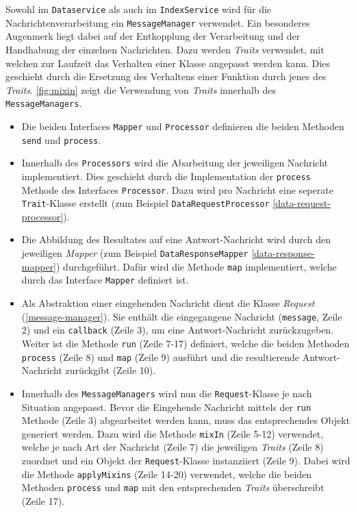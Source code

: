 
Sowohl im \texttt{Dataservice} als auch im \texttt{IndexService} wird für die Nachrichtenverarbeitung ein \texttt{Mess\-age\-Man\-ager} verwendet. Ein besonderes Augenmerk liegt dabei auf der Entkopplung der Verarbeitung und der Handhabung der einzelnen Nachrichten. Dazu werden \textit{Traits} verwendet, mit welchen zur Laufzeit das Verhalten einer Klasse angepasst werden kann. Dies geschieht durch die Ersetzung des Verhaltens einer Funktion durch jenes des \textit{Traits}. \autoref{fig:mixin} zeigt die Verwendung von \textit{Traits} innerhalb des \texttt{Mes\-sage\-Man\-agers}.

\begin{itemize}
    \item Die beiden Interfaces \texttt{Mapper} und \texttt{Processor} definieren die beiden Methoden \texttt{send} und \texttt{process}.\\
    \item Innerhalb des \texttt{Processors} wird die Abarbeitung der jeweiligen Nachricht implementiert. Dies geschieht durch die Implementation der \texttt{process} Methode des Interfaces \texttt{Processor}. Dazu wird pro Nachricht eine seperate \texttt{Trait}-Klasse erstellt (zum Beispiel \texttt{DataRequestProcessor} \autoref{data-request-processor}).\\
    \item Die Abbildung des Resultates auf eine Antwort-Nachricht wird durch den jeweiligen \textit{Mapper} (zum Beispiel \texttt{Da\-ta\-Resp\-onse\-Map\-per} \autoref{data-response-mapper}) durchgeführt. Dafür wird die Methode \texttt{map} implementiert, welche durch das Interface \texttt{Mapper} definiert ist.\\    
    \item Als Abstraktion einer eingehenden Nachricht dient die Klasse \textit{Request} (\autoref{message-manager}). Sie enthält die eingegangene Nachricht (\texttt{message}, Zeile 2) und ein \texttt{callback} (Zeile 3), um eine Antwort-Nachricht zurückzugeben. Weiter ist die Methode \texttt{run} (Zeile 7-17) definiert, welche die beiden Methoden \texttt{process} (Zeile 8) und \texttt{map} (Zeile 9) ausführt und die resultierende Antwort-Nachricht zurückgibt (Zeile 10).\\
    \item Innerhalb des \texttt{MessageManagers} wird nun die \texttt{Re\-quest}-Klasse je nach Situation angepasst. Bevor die Eingehende Nachricht mittels der \texttt{run} Methode (Zeile 3) abgearbeitet werden kann, muss das entsprechendes Objekt generiert werden. Dazu wird die Methode \texttt{mixIn} (Zeile 5-12) verwendet, welche je nach Art der Nachricht (Zeile 7) die jeweiligen \textit{Traits} (Zeile 8) zuordnet und ein Objekt der \texttt{Request}-Klasse instanziiert (Zeile 9). Dabei wird die Methode \texttt{applyMixins} (Zeile 14-20) verwendet, welche die beiden Methoden \texttt{process} und \texttt{map} mit den entsprechenden \textit{Traits} überschreibt (Zeile 17).
\end{itemize}

